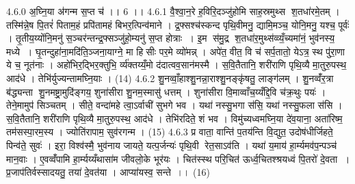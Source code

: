 4.6.0
अ॒घ्नि॒या अ॑गन्म स॒प्त च॑ ।। 6 ।।
4.6.1
वै॒श्वा॒न॒रे ह॒विरि॒दञ्जु॑होमि साह॒स्रमुथ्स श॒तधा॑रमे॒तम् । तस्मि॑न्ने॒ष पि॒तरं॑ पिताम॒हं प्रपि॑तामहं बिभर॒त्पिन्व॑माने । द्र॒फ्सश्च॑स्कन्द पृथि॒वीमनु॒ द्यामि॒मञ्च॒ योनि॒मनु॒ यश्च॒ पूर्वः॑ । तृ॒तीय॒य्योंनि॒मनु॑ स॒ञ्चर॑न्तन्द्र॒फ्सञ्जु॑हो॒म्यनु॑ स॒प्त होत्राः । इ॒म स॑मु॒द्र श॒तधा॑र॒मुथ्स॑व्व्यँ॒च्यमा॑नं॒ भुव॑नस्य॒ मध्ये । घृ॒तन्दुहा॑ना॒मदि॑ति॒ञ्जना॒याग्ने॒ मा हिसीः पर॒मे व्यो॑मन्न् । अपे॑त॒ वीत॒ वि च॑ सर्प॒तातो॒ येऽत्र॒ स्थ पु॑रा॒णा ये च॒ नूत॑नाः । अहो॑भिर॒द्भिर॒क्तुभि॒ र्व्य॑क्तय्यँ॒मो द॑दात्वव॒सान॑मस्मै । स॒वि॒तैतानि॒ शरी॑राणि पृथि॒व्यै मा॒तुरु॒पस्थ॒ आद॑धे । तेभि॑र्युज्यन्तामघ्नि॒याः । (14)
4.6.2
शु॒नव्वाँ॒हाश्शु॒नन्ना॒राश्शु॒नङ्कृ॑षतु॒ लाङ्ग॑लम् । शु॒नव्वँ॑र॒त्रा ब॑द्ध्यन्ता शु॒नमष्ट्रा॒मुदि॑ङ्गय॒ शुना॑सीरा शु॒नम॒स्मासु॑ धत्तम् । शुना॑सीरा वि॒माव्वाँच॒य्यँद्दि॒वि च॑क्र॒थुः पयः॑ । तेने॒मामुप॑ सिञ्चतम् । सीते॒ वन्दा॑महे त्वा॒ऽर्वाची॑ सुभगे भव । यथा॑ नस्सु॒भगा स॑सि॒ यथा॑ नस्सु॒फला स॑सि । स॒वि॒तैतानि॒ शरी॑राणि पृथि॒व्यै मा॒तुरु॒पस्थ॒ आद॑धे । तेभि॑रदिते॒ शं भव । विमु॑च्यध्वमघ्नि॒या दे॑व॒याना॒ अता॑रिष्म॒ तम॑सस्पा॒रम॒स्य । ज्योति॑रापाम॒ सुव॑रगन्म । (15)
4.6.3
प्र वाता॒ वान्ति॑ प॒तय॑न्ति वि॒द्युत॒ उदोष॑धीर्जिहते॒ पिन्व॑ते॒ सुवः॑ । इरा॒ विश्व॑स्मै॒ भुव॑नाय जायते॒ यत्प॒र्जन्यः॑ पृथि॒वी रेत॒साऽव॑ति । यथा॑ य॒माय॑ हा॒र्म्यमव॑प॒न्पञ्च॑ मान॒वाः । ए॒वव्वँ॑पामि हा॒र्म्यय्यँथासा॑म जीवलो॒के भूर॑यः । चित॑स्स्थ परि॒चित॑ ऊर्ध्व॒चितश्श्रयध्वं पि॒तरो॑ दे॒वता । प्र॒जाप॑तिर्वस्सादयतु॒ तया॑ दे॒वत॑या । आप्या॑यस्व॒ सन्ते ।। (16)
\anuvakamend

